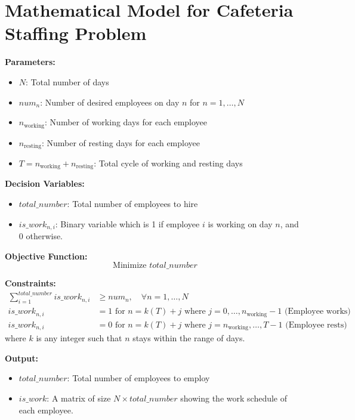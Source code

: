\documentclass{article}
\begin{document}
\section*{Mathematical Model for Cafeteria Staffing Problem}

\textbf{Parameters:}
\begin{itemize}
    \item \( N \): Total number of days
    \item \( num_n \): Number of desired employees on day \( n \) for \( n = 1, \ldots, N \)
    \item \( n_{\text{working}} \): Number of working days for each employee
    \item \( n_{\text{resting}} \): Number of resting days for each employee
    \item \( T = n_{\text{working}} + n_{\text{resting}} \): Total cycle of working and resting days
\end{itemize}

\textbf{Decision Variables:}
\begin{itemize}
    \item \( total\_number \): Total number of employees to hire
    \item \( is\_work_{n,i} \): Binary variable which is 1 if employee \( i \) is working on day \( n \), and 0 otherwise.
\end{itemize}

\textbf{Objective Function:}
\[
\text{Minimize } total\_number
\]

\textbf{Constraints:}
\begin{align}
    \sum_{i=1}^{total\_number} is\_work_{n,i} & \geq num_n, \quad \forall n = 1, \ldots, N \label{constraint1} \\
    is\_work_{n,i} & = 1 \text{ for } n = k(T) + j \text{ where } j = 0, \ldots, n_{\text{working}} - 1 \text{ (Employee works)} \\
    is\_work_{n,i} & = 0 \text{ for } n = k(T) + j \text{ where } j = n_{\text{working}}, \ldots, T - 1 \text{ (Employee rests)}
\end{align}
where \( k \) is any integer such that \( n \) stays within the range of days.

\textbf{Output:}
\begin{itemize}
    \item \( total\_number \): Total number of employees to employ
    \item \( is\_work \): A matrix of size \( N \times total\_number \) showing the work schedule of each employee.
\end{itemize}
\end{document}
